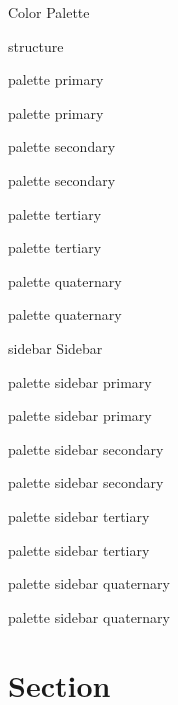 \documentclass[titlebar,fancyfoot,11pt]{khbeamer}
\begin{document}
\begin{frame}{Color Palette}

\textcolor{structure}{structure}

\begin{minipage}{10em}
	\begin{beamercolorbox}{palette primary}
	\strut palette primary
	\end{beamercolorbox}

	\begin{beamercolorbox}{palette secondary}
	\strut palette secondary
	\end{beamercolorbox}

	\begin{beamercolorbox}{palette tertiary}
	\strut palette tertiary
	\end{beamercolorbox}

	\begin{beamercolorbox}{palette quaternary}
	\strut palette quaternary
	\end{beamercolorbox}
\end{minipage}

\begin{minipage}{12em}
\small
\begin{beamercolorbox}{sidebar}
	Sidebar

	\begin{beamercolorbox}{palette sidebar primary}
	\strut palette sidebar primary
	\end{beamercolorbox}

	\begin{beamercolorbox}{palette sidebar secondary}
	\strut palette sidebar secondary
	\end{beamercolorbox}

	\begin{beamercolorbox}{palette sidebar tertiary}
	\strut palette sidebar tertiary
	\end{beamercolorbox}

	\begin{beamercolorbox}{palette sidebar quaternary}
	\strut palette sidebar quaternary
	\end{beamercolorbox}
\end{beamercolorbox}
\end{minipage}
\end{frame}


\section{Section}
\begin{frame}\sectionpage\end{frame}
\end{document}
